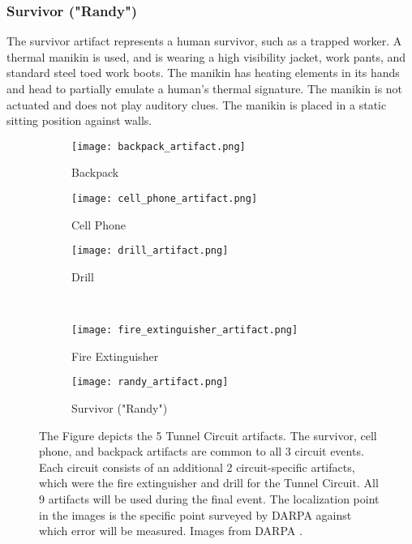 \subsubsection{Survivor ("Randy")}

The survivor artifact represents a human survivor, such as a trapped worker. A thermal manikin is used, and is wearing a high visibility jacket, work pants, and standard steel toed work boots. The manikin has heating elements in its hands and head to partially emulate a human's thermal signature. The manikin is not actuated and does not play auditory clues. The manikin is placed in a static sitting position against walls.

\begin{figure}
	\centering
	\begin{subfigure}{0.32\textwidth}
		\texttt{[image: backpack\_artifact.png]}
		\caption{Backpack}
		\label{backpack}		
	\end{subfigure}
	\hfill
	\begin{subfigure}{0.32\textwidth}
		\texttt{[image: cell\_phone\_artifact.png]}
		\caption{Cell Phone}
		\label{cell phone}
	\end{subfigure}	
	\hfill
	\begin{subfigure}{0.32\textwidth}
		\texttt{[image: drill\_artifact.png]}
		\caption{Drill}
		\label{drill}
	\end{subfigure}
	\\
	\begin{subfigure}{0.32\textwidth}
		\texttt{[image: fire\_extinguisher\_artifact.png]}
		\caption{Fire Extinguisher}
		\label{fire extinguisher}
	\end{subfigure}
	\begin{subfigure}{0.32\textwidth}
		\texttt{[image: randy\_artifact.png]}
		\caption{Survivor ("Randy")}
		\label{randy}
	\end{subfigure}	
	\caption[Tunnel Circuit artifacts]{The Figure depicts the 5 Tunnel Circuit artifacts. The survivor, cell phone, and backpack artifacts are common to all 3 circuit events. Each circuit consists of an additional 2 circuit-specific artifacts, which were the fire extinguisher and drill for the Tunnel Circuit. All 9 artifacts will be used during the final event. The localization point in the images is the specific point surveyed by DARPA against which error will be measured. Images from DARPA \cite{tunnel_artifacts}.}
	\label{tunnel artifacts}
\end{figure}

